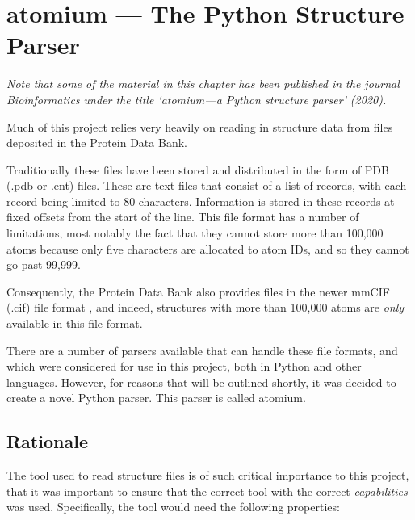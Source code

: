 


\chapter{atomium --- The Python Structure Parser} %
\label{Chapter3}


\emph{Note that some of the material in this chapter has been published in the journal Bioinformatics under the title `atomium—a Python structure parser' (2020).}

Much of this project relies very heavily on reading in structure data from files deposited in the Protein Data Bank.

Traditionally these files have been stored and distributed in the form of PDB (.pdb or .ent) files. These are text files that consist of a list of records, with each record being limited to 80 characters. Information is stored in these records at fixed offsets from the start of the line. This file format has a number of limitations, most notably the fact that they cannot store more than 100,000 atoms because only five characters are allocated to atom IDs, and so they cannot go past 99,999.

Consequently, the Protein Data Bank also provides files in the newer mmCIF (.cif) file format \cite{hall1991mmcif}, and indeed, structures with more than 100,000 atoms are \emph{only} available in this file format.

There are a number of parsers available that can handle these file formats, and which were considered for use in this project, both in Python and other languages. However, for reasons that will be outlined shortly, it was decided to create a novel Python parser. This parser is called atomium.

\section{Rationale}

The tool used to read structure files is of such critical importance to this project, that it was important to ensure that the correct tool with the correct \emph{capabilities} was used. Specifically, the tool would need the following properties:

